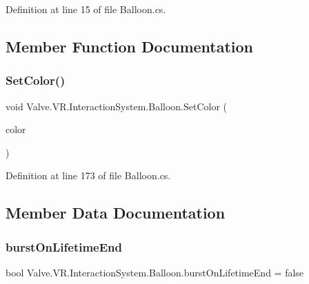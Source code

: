 Definition at line 15 of file Balloon.\+cs.



\subsection{Member Function Documentation}
\mbox{\label{class_valve_1_1_v_r_1_1_interaction_system_1_1_balloon_a2679347764a17cc6ea4b7796e25840fc}} 
\subsubsection{\texorpdfstring{SetColor()}{SetColor()}}
{\footnotesize\ttfamily void Valve.\+V\+R.\+Interaction\+System.\+Balloon.\+Set\+Color (\begin{DoxyParamCaption}\item[{\mbox{\hyperlink{class_valve_1_1_v_r_1_1_interaction_system_1_1_balloon_afa934082ca64404919e75be87f823175}{Balloon\+Color}}}]{color }\end{DoxyParamCaption})}



Definition at line 173 of file Balloon.\+cs.



\subsection{Member Data Documentation}
\mbox{\label{class_valve_1_1_v_r_1_1_interaction_system_1_1_balloon_a1f7c2cfd35fbc4c26b2975c9492d488c}} 
\subsubsection{\texorpdfstring{burstOnLifetimeEnd}{burstOnLifetimeEnd}}
{\footnotesize\ttfamily bool Valve.\+V\+R.\+Interaction\+System.\+Balloon.\+burst\+On\+Lifetime\+End = false}



